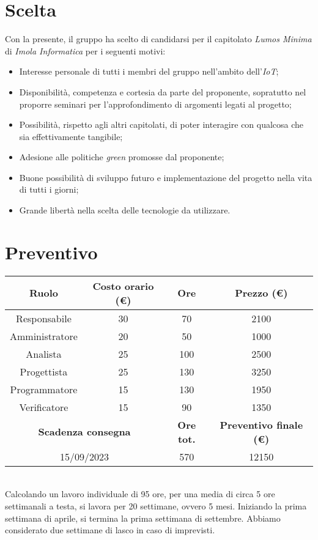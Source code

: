 \documentclass[a4paper, 12pt]{article}
\begin{document}
\makefrontpage

\section*{Scelta}
Con la presente, il gruppo ha scelto di candidarsi per il capitolato \textit{Lumos Minima} di \textit{Imola Informatica} per i seguenti motivi:
\begin{itemize}
    \item Interesse personale di tutti i membri del gruppo nell'ambito dell'\textit{IoT};
    \item Disponibilità, competenza e cortesia da parte del proponente, sopratutto nel proporre seminari per l'approfondimento di argomenti legati al progetto;
    \item Possibilità, rispetto agli altri capitolati, di poter interagire con qualcosa che sia effettivamente tangibile;
    \item Adesione alle politiche \textit{green} promosse dal proponente;
    \item Buone possibilità di sviluppo futuro e implementazione del progetto nella vita di tutti i giorni;
    \item Grande libertà nella scelta delle tecnologie da utilizzare.
\end{itemize}

\section*{Preventivo}
\begin{tabular}{|c|c|c|c|}
    \hline
    \textbf{Ruolo} & \textbf{Costo orario (\euro)} & \textbf{Ore} & \textbf{Prezzo (\euro)}\\
    \hline
    Responsabile & 30 & 70 & 2100\\
    \hline
    Amministratore & 20 & 50 & 1000\\
    \hline
    Analista & 25 & 100 & 2500\\
    \hline
    Progettista & 25 & 130 & 3250\\
    \hline
    Programmatore & 15 & 130 & 1950\\
    \hline
    Verificatore & 15 & 90 & 1350\\
    \hline\hline
    \multicolumn{2}{|c|}{\textbf{Scadenza consegna}} & \textbf{Ore tot.} & \textbf{Preventivo finale (\euro)}\\
    \hline
    \multicolumn{2}{|c|}{15/09/2023} & 570 & 12150\\
    \hline
\end{tabular}\\[8pt]
Calcolando un lavoro individuale di 95 ore, per una media di circa 5 ore settimanali a testa, si lavora per 20 settimane, ovvero 5 mesi. Iniziando la prima settimana di aprile, si termina la prima settimana di settembre. Abbiamo considerato due settimane di lasco in caso di imprevisti.
\end{document}

